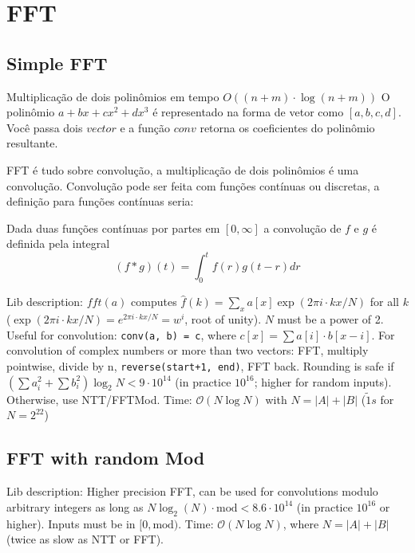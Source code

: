     \section{FFT}
    
    \subsection{Simple FFT}
    Multiplicação de dois polinômios em tempo $O((n+m) \cdot \log(n+m))$
    O polinômio $ a + bx + cx^2 + dx^3$ é representado na forma de vetor como $[a, b, c, d]$. Você passa dois $vector$ e a função $conv$ retorna os coeficientes do polinômio resultante.

    FFT é tudo sobre convolução, a multiplicação de dois polinômios é uma convolução. Convolução pode ser feita com funções contínuas ou discretas, a definição para funções contínuas seria:
    
    Dada duas funções contínuas por partes em $[0,\infty]$ a convolução de $f$ e $g$ é definida pela integral
        \[
            (f*g)(t) = \int_0^t f(r)g(t-r)dr
        \]

    Lib description: $fft(a)$ computes $\hat f(k) = \sum_x a[x] \exp(2\pi i \cdot k x / N)$ for all $k$ ($\exp(2\pi i \cdot kx/N) = e^{2\pi i \cdot kx/N} = w^i$, root of unity). $N$ must be a power of 2.
    Useful for convolution:
    \texttt{conv(a, b) = c}, where $c[x] = \sum a[i] \cdot b[x-i]$.
    For convolution of complex numbers or more than two vectors: FFT, multiply pointwise, divide by n, \texttt{reverse(start+1, end)}, FFT back. Rounding is safe if $(\sum a_i^2 + \sum b_i^2)\log_2{N} < 9\cdot10^{14}$
    (in practice $10^{16}$; higher for random inputs).
    Otherwise, use NTT/FFTMod. Time: $\mathcal{O}(N \log N)$ with $N = |A|+|B|$ ($\tilde 1s$ for $N=2^{22}$)

    \subsection{FFT with random Mod}

     Lib description: Higher precision FFT, can be used for convolutions modulo arbitrary integers as long as $N\log_2(N)\cdot \text{mod} < 8.6 \cdot 10^{14}$ (in practice $10^{16}$ or higher). Inputs must be in $[0, \text{mod})$. Time: $\mathcal{O}(N \log N)$, where $N = |A|+|B|$ (twice as slow as NTT or FFT).

     
